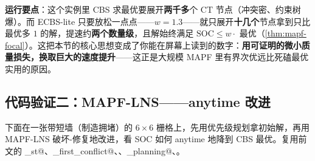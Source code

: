 \textbf{运行要点}：这个实例里 CBS 求最优要展开\textbf{两千多}个 CT 节点（冲突密、约束树爆）。而 ECBS-lite 只要放松一点点——$w{=}1.3$——就只展开\textbf{十几个}节点拿到只比最优多 $1$ 的解，提速约\textbf{两个数量级}，且解始终满足 $\mathrm{SOC}\le w\cdot$ 最优（\cref{thm:mapf-focal}）。这把本节的核心思想变成了你能在屏幕上读到的数字：\textbf{用可证明的微小质量损失，换取巨大的速度提升}——这正是大规模 MAPF 里有界次优远比死磕最优实用的原因。

\subsection{代码验证二：MAPF-LNS——anytime 改进}
\label{sec:mapf-lns-code}

下面在一张带短墙（制造拥堵）的 $6\times6$ 栅格上，先用优先级规划拿初始解，再用 MAPF-LNS 破坏-修复地改进，看 SOC 如何 anytime 地降到 CBS 最优。复用前文的 \verb@astar_st@、\verb@find_first_conflict@、\verb@soc@、\verb@prioritized_planning@、\verb@cbs@。


